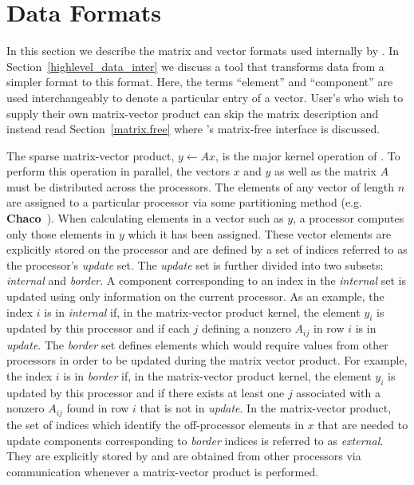 \section{Data Formats\label{data_formats}}

In this section we describe the matrix and vector formats used internally by
\Az{}. 
In Section~\ref{highlevel_data_inter} we discuss a tool that transforms
data from a simpler format to this format. Here, the terms ``element'' and
``component'' are used interchangeably to denote a particular entry of a
vector.
User's who wish to supply their
own matrix-vector product can skip the matrix description and instead
read Section~\ref{matrix.free} where \Az{}'s matrix-free interface
is discussed.


The sparse matrix-vector product, $y \leftarrow Ax$, is the major kernel
operation of \Az{}. To perform this operation in parallel, the vectors $x$ and
$y$ as well as the matrix $A$ must be distributed across the processors.  The
elements of any vector of length $n$ are assigned to a particular processor via
some partitioning method (e.g. {\bf Chaco}~\cite{chaco}).  When calculating
elements in a vector such as $y$, a processor computes only those elements in
$y$ which it has been assigned.  These vector elements are explicitly stored on
the processor and are defined by a set of indices referred to as the
processor's {\it update\/} set.  The {\it update\/} set is further divided into
two subsets: {\it internal} and {\it border}.  A component corresponding to an
index in the {\it internal} set is updated using only information on the
current processor.  As an example, the index $i$ is in {\it internal} if, in
the matrix-vector product kernel, the element $y_i$ is updated by this
processor and if each $j$ defining a nonzero $A_{ij}$ in row $i$ is in {\it
  update\/}.  The {\it border} set defines elements which would require values
from other processors in order to be updated during the matrix vector product.
For example, the index $i$ is in {\it border} if, in the matrix-vector product
kernel, the element $y_i$ is updated by this processor and if there exists at
least one $j$ associated with a nonzero $A_{ij}$ found in row $i$ that is not
in {\it update\/}.  In the matrix-vector product, the set of indices which
identify the off-processor elements in $x$ that are needed to update components
corresponding to {\it border} indices is referred to as {\it external}.  They
are explicitly stored by and are obtained from other processors via
communication whenever a matrix-vector product is performed.
